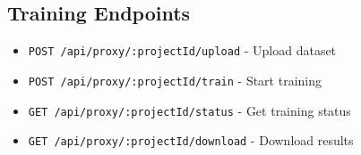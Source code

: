 \documentclass[11pt,a4paper]{article}
\begin{document}
\subsection{Training Endpoints}
\begin{itemize}[noitemsep]
    \item \texttt{POST /api/proxy/:projectId/upload} - Upload dataset
    \item \texttt{POST /api/proxy/:projectId/train} - Start training
    \item \texttt{GET /api/proxy/:projectId/status} - Get training status
    \item \texttt{GET /api/proxy/:projectId/download} - Download results
\end{itemize}
\end{document}
